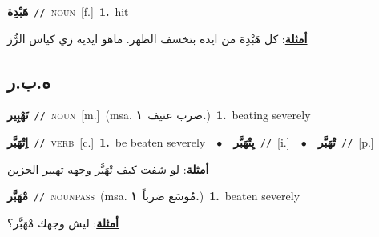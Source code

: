 \documentclass[10pt,a4paper,twoside]{article} %
\begin{document}
\begin{multicols}{2}
{{\setlength\topsep{0pt}\textbf{\foreignlanguage{arabic}{هَبْدِة}}\ {\color{gray}\texttt{//}\color{black}}\ \textsc{noun}\ [f.]\ \textbf{1.}~hit\  \begin{flushright}\color{gray}\foreignlanguage{arabic}{\textbf{\underline{\foreignlanguage{arabic}{أمثلة}}}: كل هَبْدِة من ايده بتخسف الظهر. ماهو ايديه زي كياس الرُّز}\end{flushright}\color{black}} \vspace{2mm}

\vspace{-3mm}
\subsection*{\color{blue}\foreignlanguage{arabic}{ه.ب.ر}\color{blue}{}} 

{\setlength\topsep{0pt}\textbf{\foreignlanguage{arabic}{تَهْبِير}}\ {\color{gray}\texttt{//}\color{black}}\ \textsc{noun}\ [m.]\ \color{gray}(msa. \foreignlanguage{arabic}{ضرب عنيف}~\foreignlanguage{arabic}{\textbf{١.}})\color{black}\ \textbf{1.}~beating severely\ 

{\setlength\topsep{0pt}\textbf{\foreignlanguage{arabic}{اِتْهَبَّر}}\ {\color{gray}\texttt{//}\color{black}}\ \textsc{verb}\ [c.]\ \textbf{1.}~be beaten severely\ \ $\bullet$\ \ \setlength\topsep{0pt}\textbf{\foreignlanguage{arabic}{يِتْهَبَّر}}\ {\color{gray}\texttt{//}\color{black}}\ [i.]\ \ $\bullet$\ \ \setlength\topsep{0pt}\textbf{\foreignlanguage{arabic}{تْهَبَّر}}\ {\color{gray}\texttt{//}\color{black}}\ [p.]\  \begin{flushright}\color{gray}\foreignlanguage{arabic}{\textbf{\underline{\foreignlanguage{arabic}{أمثلة}}}: لو شفت كيف تْهَبَّر وجهه تهبير الحزين}\end{flushright}\color{black}} \vspace{2mm}

{\setlength\topsep{0pt}\textbf{\foreignlanguage{arabic}{مْهَبَّر}}\ {\color{gray}\texttt{//}\color{black}}\ \textsc{noun\textunderscore pass}\ \color{gray}(msa. \foreignlanguage{arabic}{مُوسَع ضرباً}~\foreignlanguage{arabic}{\textbf{١.}})\color{black}\ \textbf{1.}~beaten severely\  \begin{flushright}\color{gray}\foreignlanguage{arabic}{\textbf{\underline{\foreignlanguage{arabic}{أمثلة}}}: ليش وجهك مْهَبَّر؟}\end{flushright}\color{black}} \vspace{2mm}

}}
\end{multicols}
\end{document}
